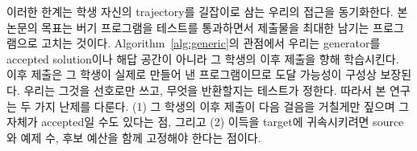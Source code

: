 \documentclass[10pt,conference]{IEEEtran}
\begin{document}
이러한 한계는 학생 자신의 trajectory를 길잡이로 삼는 우리의 접근을 동기화한다. 본 논문의 목표는 버기 프로그램을 테스트를 통과하면서 제출물을 최대한 남기는 프로그램으로 고치는 것이다. Algorithm~\ref{alg:generic}의 관점에서 우리는 generator를 accepted solution이나 해답 공간이 아니라 그 학생의 이후 제출을 향해 학습시킨다. 이후 제출은 그 학생이 실제로 만들어 낸 프로그램이므로 도달 가능성이 구성상 보장된다. 우리는 그것을 선호로만 쓰고, 무엇을 반환할지는 테스트가 정한다. 따라서 본 연구는 두 가지 난제를 다룬다. (1) 그 학생의 이후 제출이 다음 걸음을 거칠게만 짚으며 그 자체가 accepted일 수도 있다는 점, 그리고 (2) 이득을 target에 귀속시키려면 source와 예제 수, 후보 예산을 함께 고정해야 한다는 점이다.
\end{document}

